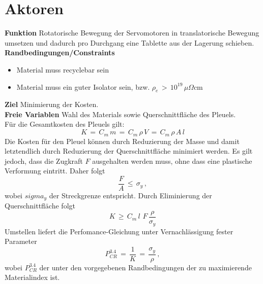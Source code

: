 \section{Aktoren}
\textbf{Funktion} Rotatorische Bewegung der Servomotoren in translatorische Bewegung umsetzen und dadurch pro Durchgang eine Tablette aus der Lagerung schieben.\\
\textbf{Randbedingungen/Constraints}
\begin{itemize}
	\item Material muss recyclebar sein
	\item Material muss ein guter Isolator sein, bzw. $\rho_e\,>\,10^{19}\,\mu\Omega$cm
\end{itemize}
\textbf{Ziel} Minimierung der Kosten.\\
\textbf{Freie Variablen} Wahl des Materials sowie Querschnittfläche des Pleuels.\\
Für die Gesamtkosten des Pleuels gilt:
\begin{equation}
	K\,=\,C_m\,m\,=\,C_m\,\rho\,V\,=\,C_m\,\rho\,A\,l
\end{equation}
Die Kosten für den Pleuel können durch Reduzierung der Masse und damit letztendlich durch Reduzierung der Querschnittfläche minimiert werden. Es gilt jedoch, dass die Zugkraft $F$ ausgehalten werden muss, ohne dass eine plastische Verformung eintritt. Daher folgt
\begin{equation}
	\frac{F}{A}\,\le\,\sigma_y\,,
\end{equation}
wobei $sigma_y$ der Streckgrenze entspricht.
Durch Eliminierung der Querschnittfläche folgt
\begin{equation}
K\,\ge\,C_m\,l\,\,F\,\frac{\rho}{\sigma_y}
\end{equation}
Umstellen liefert die Perfomance-Gleichung unter Vernachlässigung fester Parameter
\begin{equation}\label{performance34}
P_{CR}^{3.4}\,=\,\frac{1}{K}\,=\,\frac{\sigma_y}{\rho}\,,
\end{equation}
wobei $P_{CR}^{3.4}$ der unter den vorgegebenen Randbedingungen der zu maximierende Materialindex ist.
